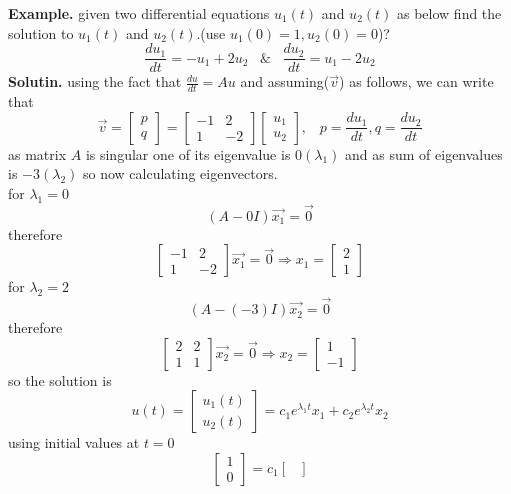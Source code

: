 \documentclass[a4paper,11pt]{article}
\numberwithin{equation}{section}
\begin{document}
\begin{itemize}
\textbf{Example.} given two differential equations $u_1(t)$ and $u_2(t)$ as below find the solution to $u_1(t)$ and $u_2(t)$.\hspace{5pt}(use $u_1(0)=1,u_2(0)=0$)?
\[
\frac{du_1}{dt}=-u_1+2u_2\hspace{10pt} \&\hspace{10pt}\frac{du_2}{dt}=u_1-2u_2
\]
\textbf{Solutin.} using the fact that $\frac{du}{dt}=Au$ and assuming($\vec{v}$) as follows, we can write that 
\[\vec{v}=
\begin{bmatrix}
    p\\q
\end{bmatrix}=
\begin{bmatrix}
    -1&2\\1&-2
\end{bmatrix}
\begin{bmatrix}
    u_1\\u_2
\end{bmatrix},\hspace{10pt} p=\frac{du_1}{dt},q=\frac{du_2}{dt}
\]
as matrix $A$ is singular one of its eigenvalue is $0(\lambda_1)$ and as sum of eigenvalues is $-3(\lambda_2)$ so now calculating eigenvectors.\\
for $\lambda_1=0$
\[
(A-0I)\vec{x_1}=\vec{0}
\]
therefore
\[
\begin{bmatrix}
    -1&2\\1&-2
\end{bmatrix}\vec{x_1}=\vec{0} \Longrightarrow x_1=\begin{bmatrix}
    2\\1
\end{bmatrix}
\]
for $\lambda_2=2$
\[
(A-(-3)I)\vec{x_2}=\vec{0}
\]
therefore
\[
\begin{bmatrix}
    2&2\\1&1
\end{bmatrix}\vec{x_2}=\vec{0} \Longrightarrow x_2=\begin{bmatrix}
    1\\-1
\end{bmatrix}
\]
so the solution is 
\[
   u(t)=\begin{bmatrix}u_1(t)\\u_2(t)\end{bmatrix}=c_1e^{{\lambda_1}t}x_1+c_2e^{{\lambda_2}t}x_2
\]
using initial values at $t=0$
\[
\begin{bmatrix}
    1\\0
\end{bmatrix}=c_1\begin{bmatrix}

\end{bmatrix}\]
\end{itemize}
\end{document}
